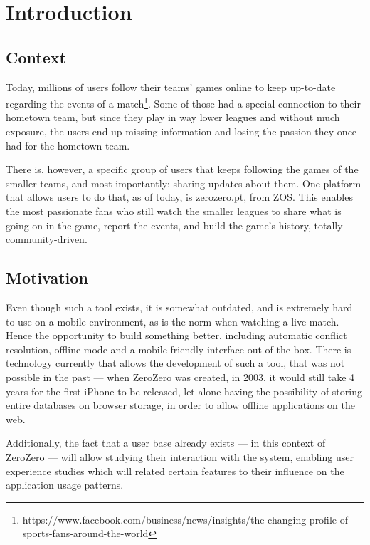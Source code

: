 \chapter{Introduction} \label{chap:intro}

\section{Context}

Today, millions of users follow their teams' games online to keep up-to-date regarding the events of a match\footnote{https://www.facebook.com/business/news/insights/the-changing-profile-of-sports-fans-around-the-world}. Some of those had a special connection to their hometown team, but since they play in way lower leagues and without much exposure, the users end up missing information and losing the passion they once had for the hometown team.

There is, however,  a specific group of users that keeps following the games of the smaller teams, and most importantly: sharing updates about them. One platform that allows users to do that, as of today, is zerozero.pt, from ZOS. This enables the most passionate fans who still watch the smaller leagues to share what is going on in the game, report the events, and build the game's history, totally community-driven.

\section{Motivation}

 Even though such a tool exists, it is somewhat outdated, and is extremely hard to use on a mobile environment, as is the norm when watching a live match. Hence the opportunity to build something better, including automatic conflict resolution, offline mode and a mobile-friendly interface out of the box. There is technology currently that allows the development of such a tool, that was not possible in the past --- when ZeroZero was created, in 2003, it would still take 4 years for the first iPhone to be released, let alone having the possibility of storing entire databases on browser storage, in order to allow offline applications on the web.
 
 Additionally, the fact that a user base already exists --- in this context of ZeroZero --- will allow studying their interaction with the system, enabling user experience studies which will related certain features to their influence on the application usage patterns.

